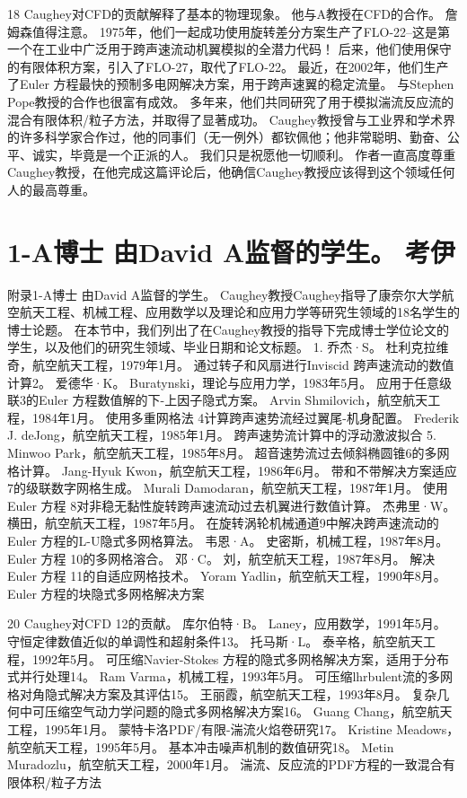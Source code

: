 \documentclass[UTF8,11pt,a4paper,openany,fontset=fandol]{ctexbook}
\begin{document}
18 Caughey对CFD的贡献解释了基本的物理现象。 他与A教授在CFD的合作。 詹姆森值得注意。 1975年，他们一起成功使用旋转差分方案生产了FLO-22--这是第一个在工业中广泛用于跨声速流动机翼模拟的全潜力代码！ 后来，他们使用保守的有限体积方案，引入了FLO-27，取代了FLO-22。 最近，在2002年，他们生产了Euler 方程最快的预制多电网解决方案，用于跨声速翼的稳定流量。 与Stephen Pope教授的合作也很富有成效。 多年来，他们共同研究了用于模拟湍流反应流的混合有限体积/粒子方法，并取得了显著成功。 Caughey教授曾与工业界和学术界的许多科学家合作过，他的同事们（无一例外）都钦佩他；他非常聪明、勤奋、公平、诚实，毕竟是一个正派的人。 我们只是祝愿他一切顺利。 作者一直高度尊重Caughey教授，在他完成这篇评论后，他确信Caughey教授应该得到这个领域任何人的最高尊重。

\section{1-A博士 由David A监督的学生。 考伊}
附录1-A博士 由David A监督的学生。 Caughey教授Caughey指导了康奈尔大学航空航天工程、机械工程、应用数学以及理论和应用力学等研究生领域的18名学生的博士论题。 在本节中，我们列出了在Caughey教授的指导下完成博士学位论文的学生，以及他们的研究生领域、毕业日期和论文标题。 1. 乔杰·S。 杜利克拉维奇，航空航天工程，1979年1月。 通过转子和风扇进行Inviscid 跨声速流动的数值计算2。 爱德华·K。 Buratynski，理论与应用力学，1983年5月。 应用于任意级联3的Euler 方程数值解的下-上因子隐式方案。 Arvin Shmilovich，航空航天工程，1984年1月。 使用多重网格法 4计算跨声速势流经过翼尾-机身配置。 Frederik J. deJong，航空航天工程，1985年1月。 跨声速势流计算中的浮动激波拟合 5. Minwoo Park，航空航天工程，1985年8月。 超音速势流过去倾斜椭圆锥6的多网格计算。 Jang-Hyuk Kwon，航空航天工程，1986年6月。 带和不带解决方案适应7的级联数字网格生成。 Murali Damodaran，航空航天工程，1987年1月。 使用Euler 方程 8对非稳无黏性旋转跨声速流动过去机翼进行数值计算。 杰弗里·W。 横田，航空航天工程，1987年5月。 在旋转涡轮机械通道9中解决跨声速流动的Euler 方程的L-U隐式多网格算法。 韦恩·A。 史密斯，机械工程，1987年8月。 Euler 方程 10的多网格溶合。 邓·C。 刘，航空航天工程，1987年8月。 解决Euler 方程 11的自适应网格技术。 Yoram Yadlin，航空航天工程，1990年8月。 Euler 方程的块隐式多网格解决方案

20 Caughey对CFD 12的贡献。 库尔伯特·B。 Laney，应用数学，1991年5月。 守恒定律数值近似的单调性和超射条件13。 托马斯·L。 泰辛格，航空航天工程，1992年5月。 可压缩Navier-Stokes 方程的隐式多网格解决方案，适用于分布式并行处理14。 Ram Varma，机械工程，1993年5月。 可压缩lhrbulent流的多网格对角隐式解决方案及其评估15。 王丽霞，航空航天工程，1993年8月。 复杂几何中可压缩空气动力学问题的隐式多网格解决方案16。 Guang Chang，航空航天工程，1995年1月。 蒙特卡洛PDF/有限-湍流火焰卷研究17。 Kristine Meadows，航空航天工程，1995年5月。 基本冲击噪声机制的数值研究18。 Metin Muradozlu，航空航天工程，2000年1月。 湍流、反应流的PDF方程的一致混合有限体积/粒子方法
\end{document}
